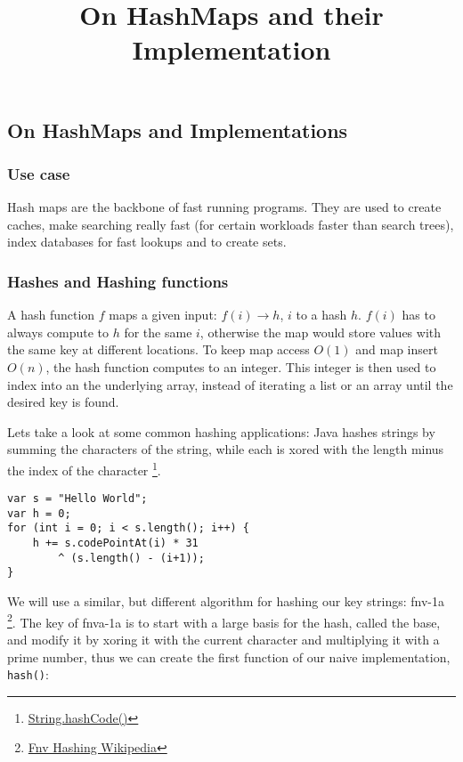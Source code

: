 

\title{On HashMaps and their Implementation}


    \subsection*{On HashMaps and Implementations}

    \subsubsection*{Use case}

    Hash maps are the backbone of fast running programs. They are used to
    create caches, make searching really fast (for certain workloads faster
    than search trees), index databases for fast lookups and to create sets.

    \subsubsection*{Hashes and Hashing functions}

    A hash function $f$ maps a given input: $f(i) \rightarrow h$, $i$ to a hash
    $h$. $f(i)$ has to always compute to $h$ for the same $i$, otherwise the
    map would store values with the same key at different locations. To keep
    map access $O(1)$ and map insert $O(n)$, the hash function computes to an
    integer. This integer is then used to index into an the underlying array,
    instead of iterating a list or an array until the desired key is found. 

    Lets take a look at some common hashing applications: Java hashes strings
    by summing the characters of the string, while each is xored with the
    length minus the index of the character
    \footnote{\href{https://docs.oracle.com/javase/8/docs/api/java/lang/String.html\#hashCode}{String.hashCode()}}.
    \begin{verbatim}
var s = "Hello World";
var h = 0;
for (int i = 0; i < s.length(); i++) {
    h += s.codePointAt(i) * 31 
        ^ (s.length() - (i+1));
}
    \end{verbatim}

    We will use a similar, but different algorithm for hashing our key strings:
    fnv-1a
    \footnote{\href{https://en.wikipedia.org/wiki/Fowler-Noll-Vo_hash_function}{Fnv
    Hashing Wikipedia}}. The key of fnva-1a is to start with a large basis for
    the hash, called the base, and modify it by xoring it with the current
    character and multiplying it with a prime number, thus we can create the
    first function of our naive implementation, \texttt{hash()}:

